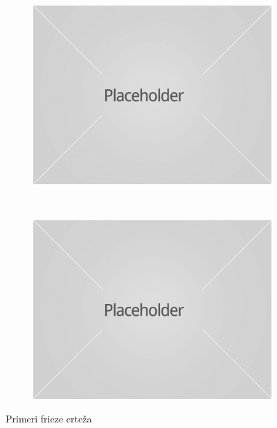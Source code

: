 \documentclass[times, utf8, diplomski]{fer}
\theoremstyle{plain}
\theoremstyle{definition}
\begin{document}
\begin{figure}[h]
\centering
\begin{subfigure}{0.4\textwidth}
\includegraphics[width=\textwidth]{placeholder}
\end{subfigure}
~
\begin{subfigure}{0.4\textwidth}
\includegraphics[width=\textwidth]{placeholder}
\end{subfigure}
\caption{Primeri frieze crte\v za}
\end{figure}\\
\end{document}

